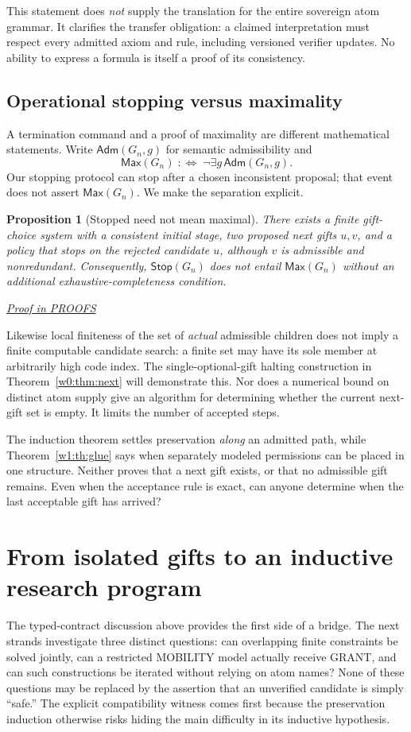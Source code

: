\documentclass[11pt,letterpaper]{article}
\newtheorem{proposition}[theorem]{Proposition}
\theoremstyle{definition}\newtheorem{definition}[theorem]{Definition}\newtheorem{example}[theorem]{Example}
\theoremstyle{remark}\newtheorem{remark}[theorem]{Remark}
\newcommand{\Adm}{\mathsf{Adm}}
\newcommand{\prooflink}[1]{\par\noindent\hfill\small\hyperref[#1]{\textit{Proof in PROOFS}}\normalsize}
\begin{document}
This statement does \emph{not} supply the translation for the entire sovereign
atom grammar.  It clarifies the transfer obligation: a claimed interpretation
must respect every admitted axiom and rule, including versioned verifier
updates.  No ability to express a formula is itself a proof of its consistency.

\subsection{Operational stopping versus maximality}
A termination command and a proof of maximality are different mathematical statements. Write $\Adm(G_n,g)$ for semantic admissibility and
\[
 \mathsf{Max}(G_n)\;:\Longleftrightarrow\;\neg\exists g\,\Adm(G_n,g).
\]
Our stopping protocol can stop after a chosen inconsistent proposal; that event does not assert $\mathsf{Max}(G_n)$. We make the separation explicit.

\begin{proposition}[Stopped need not mean maximal]\label{w1:prop:stop}
There exists a finite gift-choice system with a consistent initial stage, two proposed next gifts $u,v$, and a policy that stops on the rejected candidate $u$, although $v$ is admissible and nonredundant. Consequently, $\mathsf{Stop}(G_n)$ does not entail $\mathsf{Max}(G_n)$ without an additional exhaustive-completeness condition.
\prooflink{w1:pr:stop}
\end{proposition}

Likewise local finiteness of the set of \emph{actual} admissible children does not imply a finite computable candidate search: a finite set may have its sole member at arbitrarily high code index. The single-optional-gift halting construction in Theorem~\ref{w0:thm:next} will demonstrate this. Nor does a numerical bound on distinct atom supply give an algorithm for determining whether the current next-gift set is empty. It limits the number of accepted steps.


The induction theorem settles preservation \emph{along} an admitted path,
while Theorem~\ref{w1:th:glue} says when separately modeled permissions can
be placed in one structure. Neither proves that a next gift exists, or that
no admissible gift remains. Even when the acceptance rule is exact, can
anyone determine when the last acceptable gift has arrived?


\section{From isolated gifts to an inductive research program}\label{br:sec:handoff}
The typed-contract discussion above provides the first side of a bridge. The next strands investigate three distinct questions: can overlapping finite constraints be solved jointly, can a restricted MOBILITY model actually receive GRANT, and can such constructions be iterated without relying on atom names? None of these questions may be replaced by the assertion that an unverified candidate is simply ``safe.'' The explicit compatibility witness comes first because the preservation induction otherwise risks hiding the main difficulty in its inductive hypothesis.
\end{document}
